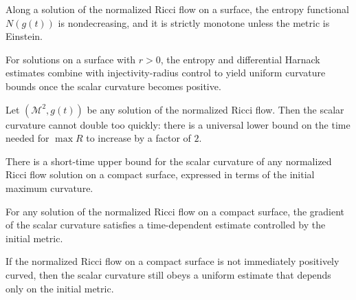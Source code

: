 \begin{proposition}
\label{ch05-prop-entropy-monotonicity}
Along a solution of the normalized Ricci flow on a surface, the entropy functional \(N(g(t))\) is nondecreasing, and it is strictly monotone unless the metric is Einstein.
\end{proposition}

\begin{proposition}
\label{ch05-prop-positive-curvature-strategy}
For solutions on a surface with \(r>0\), the entropy and differential Harnack estimates combine with injectivity-radius control to yield uniform curvature bounds once the scalar curvature becomes positive.
\end{proposition}

\begin{lemma}
\label{ch05-lem-doubling-time}
Let \((\mathcal{M}^2,g(t))\) be any solution of the normalized Ricci flow. Then the scalar curvature cannot double too quickly: there is a universal lower bound on the time needed for \(\max R\) to increase by a factor of \(2\).
\end{lemma}

\begin{corollary}
\label{ch05-cor-short-time-curvature-control}
There is a short-time upper bound for the scalar curvature of any normalized Ricci flow solution on a compact surface, expressed in terms of the initial maximum curvature.
\end{corollary}

\begin{lemma}
\label{ch05-lem-gradient-control}
For any solution of the normalized Ricci flow on a compact surface, the gradient of the scalar curvature satisfies a time-dependent estimate controlled by the initial metric.
\end{lemma}

\begin{corollary}
\label{ch05-cor-curvature-decay-away-from-positivity}
If the normalized Ricci flow on a compact surface is not immediately positively curved, then the scalar curvature still obeys a uniform estimate that depends only on the initial metric.
\end{corollary}

